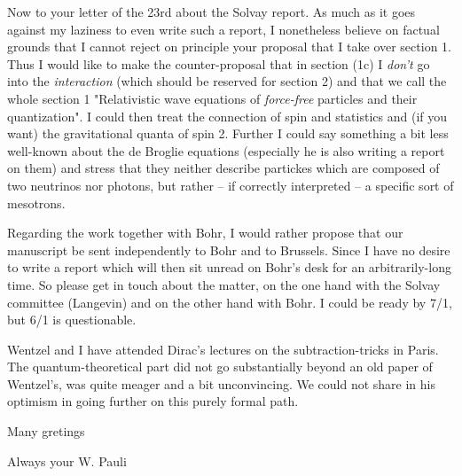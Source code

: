 \documentclass{article}
\begin{document}
Now to your letter of the 23rd about the Solvay report. As much as it goes against my laziness to even write such a report, I nonetheless believe on factual grounds that I cannot reject on principle your proposal that I take over section 1. Thus I would like to make the counter-proposal that in section (1c) I \textit{don't} go into the \textit{interaction} (which should be reserved for section 2) and that we call the whole section 1 "Relativistic wave equations of \textit{force-free} particles and their quantization". I could then treat the connection of spin and statistics and (if you want) the gravitational quanta of spin 2. Further I could say something a bit less well-known about the de Broglie equations (especially  he is also writing a report on them) and stress that they neither describe partickes which are composed of two neutrinos nor photons, but rather -- if correctly interpreted -- a specific sort of mesotrons.

Regarding the work together with Bohr, I would rather propose that our manuscript be sent independently to Bohr and to Brussels. Since I have no desire to write a report which will then sit unread on Bohr's desk for an arbitrarily-long time. So please get in touch about the matter, on the one hand with the Solvay committee (Langevin) and on the other hand with Bohr. I could be ready by 7/1, but 6/1 is questionable.

Wentzel and I have attended Dirac's lectures on the subtraction-tricks in Paris. The quantum-theoretical part did not go substantially beyond an old paper of Wentzel's, was quite meager and a bit unconvincing. We could not share in his optimism in going further on this purely formal path.

Many gretings 

Always your W. Pauli
\end{document}
